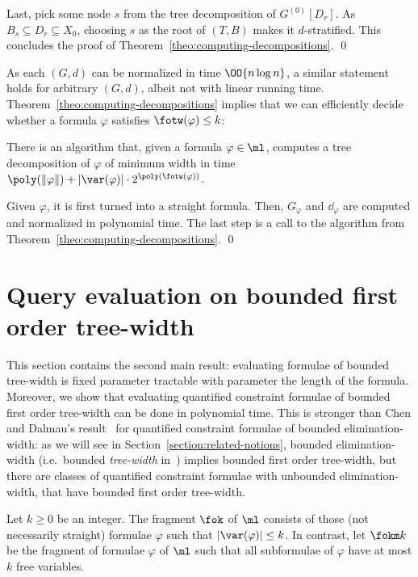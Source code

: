 \documentclass{LMCS}
\renewcommand{\phi}{\varphi}
\newcommand{\ad}{\dd_{\varphi}}
\begin{document}
Last, pick some node $s$ from the tree decomposition of $G^{(0)}[D_r]$. 
As $B_s \subseteq D_r \subseteq X_0$, 
choosing $s$ as the root of $(T,B)$ makes it $d$-stratified. 
This concludes the proof of Theorem~\ref{theo:computing-decompositions}.
\qed



As each $(G,d)$ can be normalized in time $\OO{n\log n}$, 
a similar statement holds for arbitrary $(G,d)$, 
albeit not with linear running time. 
Theorem~\ref{theo:computing-decompositions} implies 
that we can efficiently decide whether a formula
$\phi$ satisfies $\fotw(\phi)\leq k$: 

\begin{cor}\label{cor:computing-decompositions}
There is an algorithm that, given a formula $\phi\in\ml$, 
computes a tree decomposition of $\phi$ of minimum width 
in time $\poly(\|\phi\|)+\left|\var(\phi)\right|\cdot 2^{\poly(\fotw(\phi))}$. 
\end{cor}

\proof
Given $\phi$, it is first turned into a straight formula. 
Then, $G_{\phi}$ and $\ad$ are computed and normalized in polynomial time. 
The last step is a call 
to the algorithm from Theorem~\ref{theo:computing-decompositions}. 
\qed



\section{Query evaluation on bounded first order tree-width}\label{section:mc}

This section contains the second main result: 
evaluating formulae of bounded tree-width 
is fixed parameter tractable with parameter the length of the formula.
Moreover, we show that evaluating quantified constraint formulae of bounded
first order tree-width can be done in polynomial time. 
This is stronger than 
Chen and Dalmau's result~\cite{chedal05} for quantified constraint formulae of bounded 
elimination-width: as we will see in Section~\ref{section:related-notions}, 
bounded elimination-width (i.e.\ bounded \emph{tree-width} 
in~\cite{chedal05}) implies bounded first order tree-width, but there
are classes of quantified constraint formulae with unbounded elimination-width, that
have bounded first order tree-width.

\begin{defi}
Let $k\geq 0$ be an integer. 
The fragment $\fok$ of $\ml$ consists 
of those (not necessarily straight) formulae $\phi$ 
such that $\left|\var(\phi)\right|\leq k$. 
In contrast, let $\fokm k$ be the fragment of formulae $\phi$ of $\ml$ 
such that all subformulae of $\phi$ have at most $k$ free variables. 
\end{defi}
\end{document}
